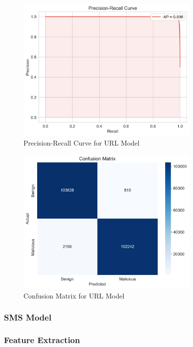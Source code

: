 \documentclass{article}
\begin{document}
\begin{figure}[htbp]
    \centering
    \includegraphics[width=0.8\textwidth]{../analysis/url/precision_recall_curve.png}
    \caption{Precision-Recall Curve for URL Model}
    \label{fig:precision_recall_curve_1}
\end{figure}

\begin{figure}[htbp]
    \centering
    \includegraphics[width=0.8\textwidth]{../analysis/url/confusion_matrix.png}
    \caption{Confusion Matrix for URL Model}
    \label{fig:confusion_matrix_1}
\end{figure}

\newpage

\subsubsection{SMS Model}
\subsubsection*{Feature Extraction}
\end{document}
